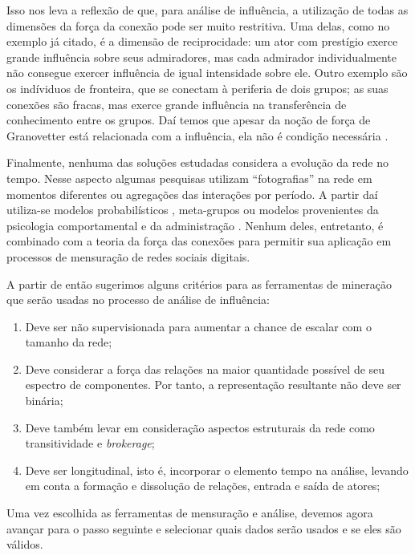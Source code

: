 Isso nos leva a reflexão de que, para análise de influência, a utilização de
todas as dimensões da força da conexão pode ser muito restritiva. Uma delas, como
no exemplo já citado, é a dimensão de reciprocidade: um ator com prestígio exerce
grande influência sobre seus admiradores, mas cada admirador individualmente não
consegue exercer influência de igual intensidade sobre ele. Outro exemplo são os
indíviduos de fronteira, que se conectam à periferia de dois grupos; as suas
conexões são fracas, mas exerce grande influência na transferência de
conhecimento entre os grupos. Daí temos que apesar da noção de força de
Granovetter está relacionada com a influência, ela não é condição necessária
\citep{Brown2007}.

Finalmente, nenhuma das soluções estudadas considera a evolução da rede no
tempo. Nesse aspecto algumas pesquisas utilizam ``fotografias'' na rede em
momentos diferentes ou agregações das interações por período. A partir daí
utiliza-se modelos probabilísticos \citep{Sarkar2005}, meta-grupos
\citep{Berger-Wolf2006} ou modelos provenientes da psicologia comportamental e da
administração \citep{Brelger2004}. Nenhum deles, entretanto, é combinado com
a teoria da força das conexões para permitir sua aplicação em processos de
mensuração de redes sociais digitais.

A partir de então sugerimos alguns critérios para as ferramentas de mineração
que serão usadas no processo de análise de influência:

\begin{enumerate}
  \item Deve ser não supervisionada para aumentar a chance de escalar com o
  tamanho da rede;
  \item Deve considerar a força das relações na maior quantidade possível de seu
  espectro de componentes. Por tanto, a representação resultante não deve ser
  binária;
  \item Deve também levar em consideração aspectos estruturais da rede como
  transitividade e \emph{brokerage};
  \item Deve ser longitudinal, isto é, incorporar o elemento tempo na análise,
 levando em conta a formação e dissolução de relações, entrada e saída de
 atores;
\end{enumerate}

Uma vez escolhida as ferramentas de mensuração e análise, devemos agora avançar
para o passo seguinte e selecionar quais dados serão usados e se eles são
válidos.

